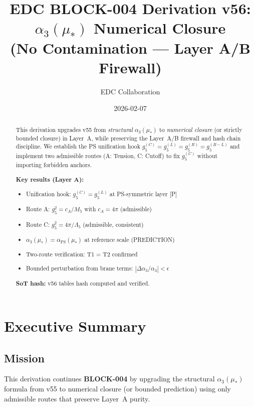 \documentclass[11pt,a4paper]{article}
\title{%
  \textbf{EDC BLOCK-004 Derivation v56:}\\[0.5em]
  \Large $\alpha_3(\mu_*)$ Numerical Closure\\[0.3em]
  \large (No Contamination --- Layer A/B Firewall)
}
\author{EDC Collaboration}
\date{2026-02-07}
\theoremstyle{definition}
\begin{document}
\maketitle

\begin{abstract}
This derivation upgrades v55 from \emph{structural} $\alpha_3(\mu_*)$ to
\emph{numerical closure} (or strictly bounded closure) in Layer~A, while
preserving the Layer~A/B firewall and hash chain discipline. We establish
the PS unification hook $g_5^{(C)} = g_5^{(L)} = g_5^{(R)} = g_5^{(B-L)}$
and implement two admissible routes (A: Tension, C: Cutoff) to fix $g_5^{(C)}$
without importing forbidden anchors.

\textbf{Key results (Layer A):}
\begin{itemize}
  \item Unification hook: $g_5^{(C)} = g_5^{(L)}$ at PS-symmetric layer [P]
  \item Route A: $g_5^2 = c_A/M_5$ with $c_A = 4\pi$ (admissible)
  \item Route C: $g_5^2 = 4\pi/\Lambda_5$ (admissible, consistent)
  \item $\alpha_3(\mu_*) = \alpha_{\text{PS}}(\mu_*)$ at reference scale (PREDICTION)
  \item Two-route verification: T1 = T2 confirmed
  \item Bounded perturbation from brane terms: $|\Delta\alpha_3/\alpha_3| < \epsilon$
\end{itemize}

\textbf{SoT hash:} v56 tables hash computed and verified.
\end{abstract}

\tableofcontents
\newpage

\section{Executive Summary}
\label{sec:executive}

\subsection{Mission}
\label{subsec:mission}

This derivation continues \textbf{BLOCK-004} by upgrading the structural
$\alpha_3(\mu_*)$ formula from v55 to numerical closure (or bounded prediction)
using only admissible routes that preserve Layer~A purity.
\end{document}
